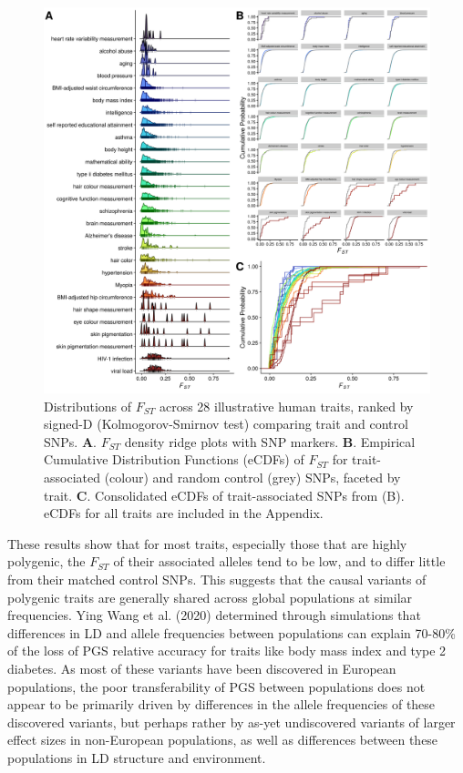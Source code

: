 \documentclass[
]{book}
\begin{document}
\begin{figure}
\includegraphics[width=1\linewidth]{figs/fst/0.1_1000_20220314_final} \caption{Distributions of \(F_{ST}\) across 28 illustrative human traits, ranked by signed-D (Kolmogorov-Smirnov test) comparing trait and control SNPs. \textbf{A}. \(F_{ST}\) density ridge plots with SNP markers. \textbf{B}. Empirical Cumulative Distribution Functions (eCDFs) of \(F_{ST}\) for trait-associated (colour) and random control (grey) SNPs, faceted by trait. \textbf{C}. Consolidated eCDFs of trait-associated SNPs from (B). eCDFs for all traits are included in the Appendix.}\label{fig:FstMain}
\end{figure}

These results show that for most traits, especially those that are highly polygenic, the \(F_{ST}\) of their associated alleles tend to be low, and to differ little from their matched control SNPs. This suggests that the causal variants of polygenic traits are generally shared across global populations at similar frequencies. Ying Wang et al. (2020) determined through simulations that differences in LD and allele frequencies between populations can explain 70-80\% of the loss of PGS relative accuracy for traits like body mass index and type 2 diabetes. As most of these variants have been discovered in European populations, the poor transferability of PGS between populations does not appear to be primarily driven by differences in the allele frequencies of these discovered variants, but perhaps rather by as-yet undiscovered variants of larger effect sizes in non-European populations, as well as differences between these populations in LD structure and environment.
\end{document}
